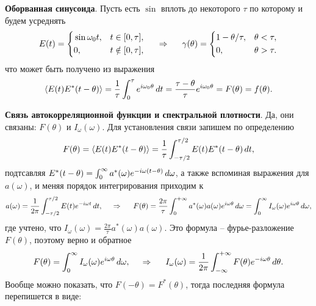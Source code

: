 \textbf{Оборванная синусоида}. Пусть есть $\sin$ вплоть до некоторого $\tau$ по которому и будем усреднять
\begin{equation*}
    E(t) = \left\{\begin{aligned}
        &\sin \omega_0 t, &t \in[0, \tau], \\
        &0,     &t \notin [0, \tau],
    \end{aligned}\right.
    \hspace{0.5cm} \Rightarrow \hspace{0.5cm}
    \gamma(\theta) = \left\{\begin{aligned}
        &1-\theta/\tau, &\theta < \tau, \\
        &0, &\theta > \tau.
    \end{aligned}\right.
\end{equation*}
что может быть получено из выражения
\begin{equation*}
    \left\langle E(t) E^* (t-\theta)\right\rangle = \frac{1}{\tau} \int_0^\tau e^{i \omega_0 \theta} \, d t = \frac{\tau-\theta}{\tau} e^{i \omega_0 \theta} = F(\theta) = f(\theta).
\end{equation*}


\textbf{Связь автокорреляционной функции и спектральной плотности}. Да, они связаны: $F(\theta)$ и $I_\omega(\omega)$. Для установления связи запишем по определению
\begin{equation*}
    F(\theta) = \left\langle E(t) E^* (t-\theta)\right\rangle = \frac{1}{\tau} \int_{-\tau/2}^{\tau/2} E(t) E^* (t-\theta) \, d t,
\end{equation*}
подтсавляя $E^*(t-\theta) = \int_0^\infty a^* (\omega) e^{-i \omega (t-\theta)} \, d \omega$, а также вспоминая выражения для $a(\omega)$, и меняя порядок интегрирования приходим к
\begin{equation*}
    a(\omega) = \frac{1}{2\pi} \int_{-\tau/2}^{\tau/2} E(t) e^{-i \omega t} \, d t,
    \hspace{0.5cm} \Rightarrow \hspace{0.5cm}
    F(\theta) = \frac{2\pi}{\tau} \int_{0}^{+\infty}  a^*(\omega) a(\omega) e^{i \omega \theta} \, d \omega = 
    \int_{0}^{\infty} I_\omega (\omega) e^{i \omega \theta} \, d \omega,
\end{equation*}
где учтено, что $I_\omega (\omega) = \frac{2\pi}{\tau} a^*(\omega) a(\omega)$. Это формула -- фурье-разложение $F(\theta)$, поэтому верно и обратное
\begin{equation*}
    F(\theta) = \int_{0}^{\infty} I_\omega (\omega) e^{i \omega \theta} \, d \omega,
    \hspace{0.5cm} \Rightarrow \hspace{0.5cm}
    I_\omega (\omega) = \frac{1}{2\pi} \int_{-\infty}^{+\infty} F(\theta) e^{-i \omega \theta} \, d \theta.
\end{equation*}
Вообще можно показать, что $F(-\theta) = F^*(\theta)$, тогда последняя формула перепишется в виде:

